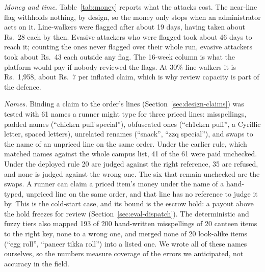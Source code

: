 \emph{Money and time.} Table~\ref{tab:money} reports what the attacks cost. The
near-line flag withholds nothing, by design, so the money only stops when an
administrator acts on it. Line-walkers were flagged after about 19 days, having
taken about Rs.~28 each by then. Evasive attackers who were flagged took about 46
days to reach it; counting the ones never flagged over their whole run, evasive
attackers took about Rs.~43 each outside any flag. The 16-week column is what the platform would pay if nobody
reviewed the flags. At 30\% line-walkers it is Rs.~1,958, about Rs.~7 per inflated
claim, which is why review capacity is part of the defence.

\emph{Names.} Binding a claim to the order's lines
(Section~\ref{sec:design-claims}) was tested with 61 names a runner might type for
three priced lines: misspellings, padded names (``chicken puff special''), obfuscated
ones (``ch1cken puff'', a Cyrillic letter, spaced letters), unrelated renames
(``snack'', ``zzq special''), and swaps to the name of an unpriced line on the same
order. Under the earlier rule, which matched names against the whole campus list, 41
of the 61 were paid unchecked. Under the deployed rule 20 are judged against the
right reference, 35 are refused, and none is judged against the wrong one. The six
that remain unchecked are the swaps. A runner can claim a priced item's money under
the name of a hand-typed, unpriced line on the same order, and that line has no
reference to judge it by. This is the cold-start case, and its bound is the escrow
hold: a payout above the hold freezes for review (Section~\ref{sec:eval-dispatch}).
The deterministic and fuzzy tiers also mapped 193 of 200 hand-written misspellings of
20 canteen items to the right key, none to a wrong one, and merged none of 20
look-alike items (``egg roll'', ``paneer tikka roll'') into a listed one. We wrote
all of these names ourselves, so the numbers measure coverage of the errors we
anticipated, not accuracy in the field.

